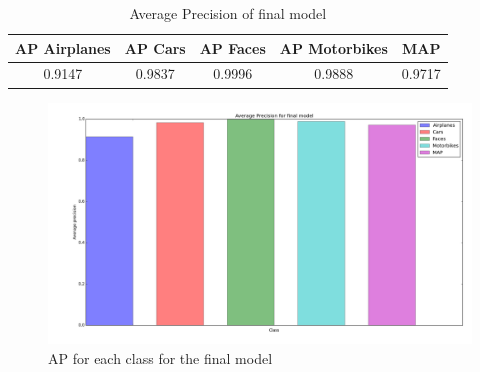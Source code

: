 \begin{table}[H]
\begin{tabular}{|ccccc|}
\hline
\textbf{AP Airplanes} & \textbf{AP Cars} & \textbf{AP Faces} & \textbf{AP Motorbikes} & \textbf{MAP}\\
\hline
0.9147 & 0.9837 & 0.9996 & 0.9888 & 0.9717\\
\hline
\end{tabular}
\caption{Average Precision of final model}
\label{tab:results_final}
\end{table}

\begin{figure}[H]
\includegraphics[width=\textwidth]{../plots/final_model}
\caption{AP for each class for the final model}
\label{plot:final}
\end{figure}
